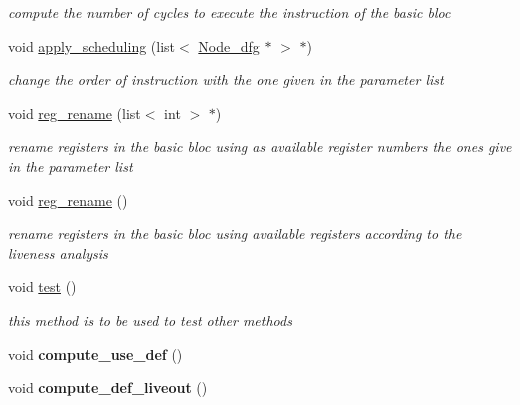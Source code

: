 \begin{DoxyCompactItemize}
\begin{DoxyCompactList}\small\item\em compute the number of cycles to execute the instruction of the basic bloc \end{DoxyCompactList}\item 
void \hyperlink{class_basic__block_a2dd5a0cf5a891f5626cd7b34849ea081}{apply\+\_\+scheduling} (list$<$ \hyperlink{class_node__dfg}{Node\+\_\+dfg} $\ast$ $>$ $\ast$)
\begin{DoxyCompactList}\small\item\em change the order of instruction with the one given in the parameter list \end{DoxyCompactList}\item 
\hypertarget{class_basic__block_a800a558f4a20dfbd8528608b0fca3854}{void \hyperlink{class_basic__block_a800a558f4a20dfbd8528608b0fca3854}{reg\+\_\+rename} (list$<$ int $>$ $\ast$)}\label{class_basic__block_a800a558f4a20dfbd8528608b0fca3854}

\begin{DoxyCompactList}\small\item\em rename registers in the basic bloc using as available register numbers the ones give in the parameter list \end{DoxyCompactList}\item 
\hypertarget{class_basic__block_a1b6570f1c03c7f7435ab681c243151c9}{void \hyperlink{class_basic__block_a1b6570f1c03c7f7435ab681c243151c9}{reg\+\_\+rename} ()}\label{class_basic__block_a1b6570f1c03c7f7435ab681c243151c9}

\begin{DoxyCompactList}\small\item\em rename registers in the basic bloc using available registers according to the liveness analysis \end{DoxyCompactList}\item 
\hypertarget{class_basic__block_a0f26ff105216c62082905097b5dcebd3}{void \hyperlink{class_basic__block_a0f26ff105216c62082905097b5dcebd3}{test} ()}\label{class_basic__block_a0f26ff105216c62082905097b5dcebd3}

\begin{DoxyCompactList}\small\item\em this method is to be used to test other methods \end{DoxyCompactList}\item 
\hypertarget{class_basic__block_a7e91d5003b7941c50199ab22a8db0d17}{void {\bfseries compute\+\_\+use\+\_\+def} ()}\label{class_basic__block_a7e91d5003b7941c50199ab22a8db0d17}

\item 
\hypertarget{class_basic__block_a11eaa93c186fb46120bb6b0397e0c590}{void {\bfseries compute\+\_\+def\+\_\+liveout} ()}\label{class_basic__block_a11eaa93c186fb46120bb6b0397e0c590}

\end{DoxyCompactItemize}
